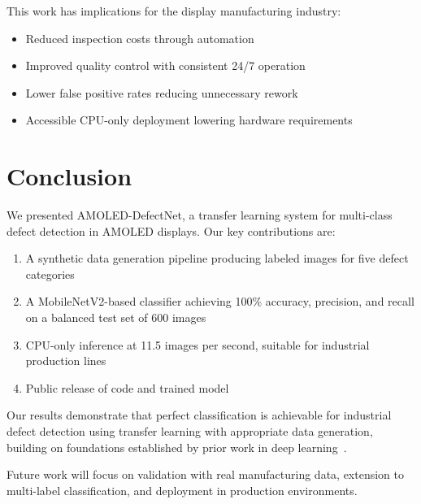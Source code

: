 \documentclass[12pt,a4paper]{article}
\newcommand{\model}{AMOLED-DefectNet}
\begin{document}
This work has implications for the display manufacturing industry:

\begin{itemize}
\item Reduced inspection costs through automation
\item Improved quality control with consistent 24/7 operation
\item Lower false positive rates reducing unnecessary rework
\item Accessible CPU-only deployment lowering hardware requirements
\end{itemize}


\section{Conclusion}

We presented \model, a transfer learning system for multi-class defect 
detection in AMOLED displays. Our key contributions are:

\begin{enumerate}
\item A synthetic data generation pipeline producing labeled images for 
    five defect categories
\item A MobileNetV2-based classifier achieving 100\% accuracy, precision, 
    and recall on a balanced test set of 600 images
\item CPU-only inference at 11.5 images per second, suitable for industrial 
    production lines
\item Public release of code and trained model
\end{enumerate}

Our results demonstrate that perfect classification is achievable for 
industrial defect detection using transfer learning with appropriate 
data generation, building on foundations established by prior work 
in deep learning~\cite{alzubaidi2021review,he2016deep,simonyan2014very}.

Future work will focus on validation with real manufacturing data, 
extension to multi-label classification, and deployment in production 
environments.

\end{document}
